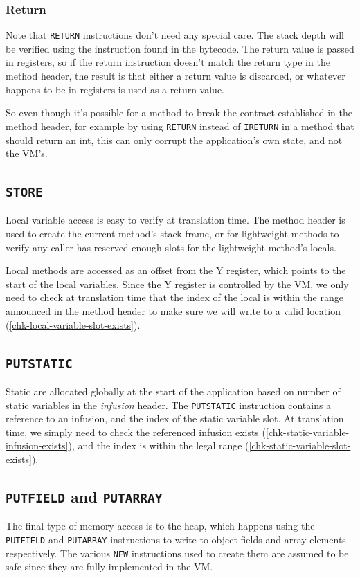 \subsubsection{Return}
Note that \texttt{RETURN} instructions don't need any special care. The stack depth will be verified using the instruction found in the bytecode. The return value is passed in registers, so if the return instruction doesn't match the return type in the method header, the result is that either a return value is discarded, or whatever happens to be in registers is used as a return value.

So even though it's possible for a method to break the contract established in the method header, for example by using \texttt{RETURN} instead of \texttt{IRETURN} in a method that should return an int, this can only corrupt the application's own state, and not the VM's.

\subsection{\texttt{STORE}}
Local variable access is easy to verify at translation time. The method header is used to create the current method's stack frame, or for lightweight methods to verify any caller has reserved enough slots for the lightweight method's locals.

Local methods are accessed as an offset from the Y register, which points to the start of the local variables. Since the Y register is controlled by the VM, we only need to check at translation time that the index of the local is within the range announced in the method header to make sure we will write to a valid location (\ref{chk-local-variable-slot-exists}).

\subsection{\texttt{PUTSTATIC}}
Static are allocated globally at the start of the application based on number of static variables in the \emph{infusion} header. The \texttt{PUTSTATIC} instruction contains a reference to an infusion, and the index of the static variable slot. At translation time, we simply need to check the referenced infusion exists (\ref{chk-static-variable-infusion-exists}), and the index is within the legal range (\ref{chk-static-variable-slot-exists}).

\subsection{\texttt{PUTFIELD} and \texttt{PUTARRAY}}
The final type of memory access is to the heap, which happens using the \texttt{PUTFIELD} and \texttt{PUTARRAY} instructions to write to object fields and array elements respectively. The various \texttt{NEW} instructions used to create them are assumed to be safe since they are fully implemented in the VM.

